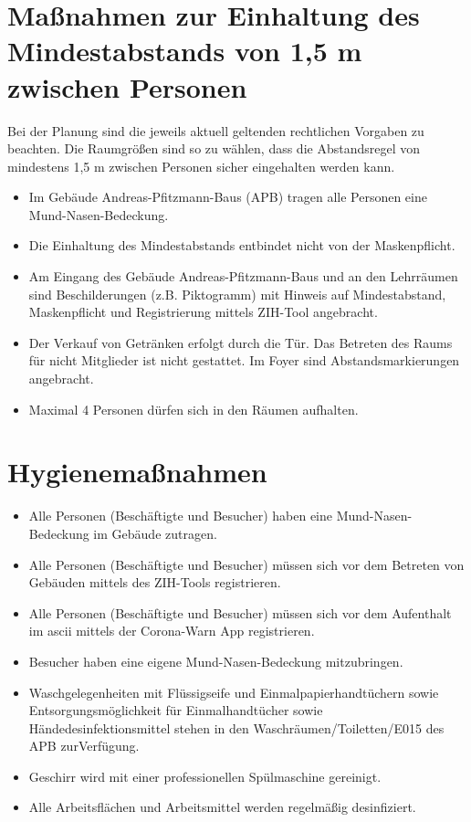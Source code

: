 \documentclass[12pt]{article}
\begin{document}
    \section{Maßnahmen zur Einhaltung des Mindestabstands von 1,5 m zwischen Personen}
        Bei der Planung sind die jeweils aktuell geltenden rechtlichen Vorgaben zu beachten.
        Die Raumgrößen sind so zu wählen, dass die Abstandsregel von mindestens 1,5 m zwischen Personen sicher eingehalten werden kann.
        \begin{itemize}
            \item Im Gebäude Andreas-Pfitzmann-Baus (APB) tragen alle Personen eine Mund-Nasen-Bedeckung.
            \item Die Einhaltung des Mindestabstands entbindet nicht von der Masken\-pflicht.
            \item Am Eingang des Gebäude Andreas-Pfitzmann-Baus und an den Lehr\-räumen sind Beschilderungen (z.B. Piktogramm) mit Hinweis auf Mindestabstand, Maskenpflicht und Registrierung mittels ZIH-Tool angebracht.
            \item Der Verkauf von Getränken erfolgt durch die Tür. 
                Das Betreten des Raums für nicht Mitglieder ist nicht gestattet. 
                Im Foyer sind Abstandsmarkierungen angebracht.
            \item Maximal 4 Personen dürfen sich in den Räumen aufhalten. 
        \end{itemize}

        \begin{center}
            
        \end{center}

    \section{Hygienemaßnahmen}
        \begin{itemize}
            \item Alle Personen (Beschäftigte und Besucher) haben eine Mund-Nasen-Bedeckung im Gebäude zutragen.
            \item Alle Personen (Beschäftigte und Besucher) müssen sich vor dem Betreten von Gebäuden mittels des ZIH-Tools registrieren.
            \item Alle Personen (Beschäftigte und Besucher) müssen sich vor dem Aufenthalt im ascii mittels der Corona-Warn App registrieren.
            \item Besucher haben eine eigene Mund-Nasen-Bedeckung mitzubringen.
            \item Waschgelegenheiten mit Flüssigseife und Einmalpapierhandtüchern sowie Entsorgungsmöglichkeit für Einmalhandtücher sowie Hände\-des\-in\-fek\-tions\-mittel stehen in den Waschräumen/Toiletten/E015 des APB zurVerfügung.
            \item Geschirr wird mit einer professionellen Spülmaschine gereinigt.
            \item Alle Arbeitsflächen und Arbeitsmittel werden regelmäßig desinfiziert.
        \end{itemize}
\end{document}
